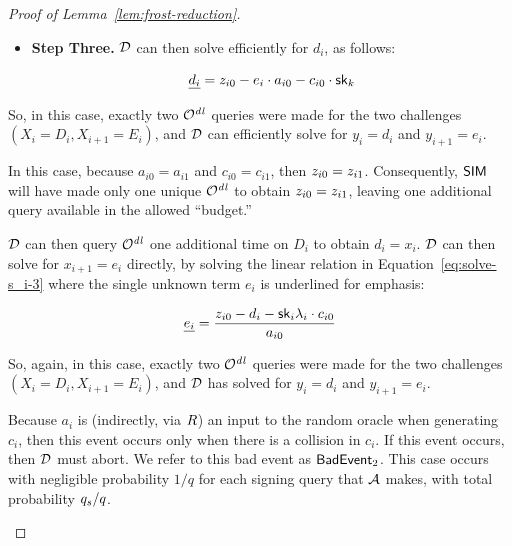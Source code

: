 \begin{proof}[Proof of Lemma~\ref{lem:frost-reduction}]
\begin{case}
\begin{itemize}
    Because $a_{i0} \neq a_{i1}$,
    Equation~\ref{eq:solve-s_i-2} is solveable.

    \item \textbf{Step Three.} $\mathcal{D}$ can then solve efficiently for $d_i$, as follows:

    \[ \underline{d_i} = z_{i0} - e_i \cdot a_{i0} - c_{i0} \cdot \mathsf{sk}_k  \]

\end{itemize}

So, in this case, exactly two $\mathcal{O}^{\mathit{dl}}$ queries were made for the two challenges $(X_i = D_i, X_{i+1} = E_i)$,
and $\mathcal{D}$ can efficiently solve for $y_i=d_i$ and $y_{i+1} = e_i$.
\end{case}

\begin{case}[$
a_{i0} = a_{i1},
c_{i0} = c_{i1}
$]

In this case,
because $a_{i0} = a_{i1}$ and
$c_{i0} = c_{i1}$,
then $z_{i0} = z_{i1}$.
Consequently,
$\mathsf{SIM}$ will have made only one unique $\mathcal{O}^{\mathit{dl}}$ to obtain $z_{i0} = z_{i1}$,
leaving one additional query available in the allowed ``budget.''


$\mathcal{D}$ can then query $\mathcal{O}^{\mathit{dl}}$ one additional time on $D_i$ to obtain $d_i=x_i$.
$\mathcal{D}$ can then solve for $x_{i+1} = e_i$ directly, by solving the linear relation in
Equation~\ref{eq:solve-s_i-3} where the single unknown term $e_i$ is underlined for emphasis:

\begin{equation} \label{eq:solve-s_i-3}
 \underline{e_i} = \frac{ z_{i0} - d_i - \mathsf{sk}_i \lambda_i \cdot c_{i0} }{a_{i0}}
\end{equation}

So, again, in this case,  exactly two $\mathcal{O}^{\mathit{dl}}$ queries were made for the two challenges  $(X_i = D_i, X_{i+1} = E_i)$, and $\mathcal{D}$ has solved for $y_i=d_i$ and $y_{i+1} = e_i$.
\end{case}

\begin{case}[$
a_{i0} \neq a_{i1},
c_{i0} = c_{i1}
$]

Because $a_i$ is (indirectly, via $R$) an input to the random oracle when generating $c_i$,
then this event occurs only when there is a collision in $c_i$.
If this event occurs,
then $\mathcal{D}$ must abort.
We refer to this bad event as $\mathsf{BadEvent}_2$.
This case occurs with negligible probability $1/q$ for each signing query that $\mathcal{A}$ makes,
with total probability $q_s/q$.
\end{case}



\end{proof}
